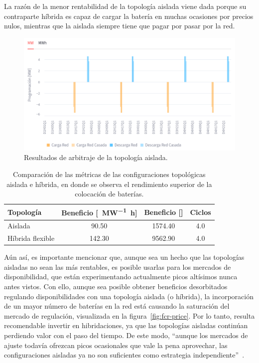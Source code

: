La razón de la menor rentabilidad de la topología aislada viene dada porque su contraparte híbrida es capaz de cargar la batería en muchas ocasiones por precios nulos, mientras que la aislada siempre tiene que pagar por pasar por la red.

\begin{figure}
  \centering
  \includegraphics[width=0.5\linewidth]{figures/posicion-aislada.png}
  \caption[Resultados de arbitraje de la topología aislada.]{Resultados de arbitraje de la topología aislada.}%
  \label{fig:posicion-aislada}
\end{figure}

\begin{table}[ht]
  \centering
  \begin{tabular}{|l|S|S|S|}
    \hline
    Topología        & {Beneficio [\si{\text{\euro}\per\mega\watt\hour}]} & {Beneficio [\si{\text{\euro}}]} & Ciclos \\
    \hline
    Aislada          &  90.50                                             & 1574.40                         & 4.0    \\
    Híbrida flexible & 142.30                                             & 9562.90                         & 4.0    \\
    \hline
  \end{tabular}
  \caption[Comparación de configuraciones topológicas.]{Comparación de las métricas de las configuraciones topológicas aislada e híbrida, en donde se observa el rendimiento superior de la colocación de baterías.}%
  \label{tab:comparacion-aislada-hibrida}
\end{table}

Aún así, es importante mencionar que, aunque sea un hecho que las topologías aisladas no sean las más rentables, es posible usarlas para los mercados de disponibilidad, que están experimentando actualmente picos altísimos nunca antes vistos. Con ello, aunque sea posible obtener beneficios desorbitados regulando disponibilidades con una topología aislada (o híbrida), la incorporación de un mayor número de baterías en la red está causando la saturación del mercado de regulación, visualizada en la figura~\ref{fig:fcr-price}. Por lo tanto, resulta recomendable invertir en hibridaciones, ya que las topologías aisladas continúan perdiendo valor con el paso del tiempo. De este modo, ``aunque los mercados de ajuste todavía ofrezcan picos ocasionales que vale la pena aprovechar, las configuraciones aisladas ya no son suficientes como estrategia independiente''~\cite{leal2025case}.

